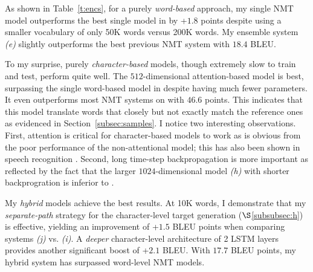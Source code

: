 As shown in Table~\ref{t:encs}, for a purely {\it word-based} approach, 
my single NMT model outperforms the best single model in \cite{jean15wmt} by
+$1.8$ points despite
using a smaller vocabulary of only 50K words versus 200K words. 
My ensemble system {\it (e)} slightly outperforms the best previous NMT system with $18.4$ BLEU.

To my surprise, purely {\it character-based} models, though extremely slow to
train and test, perform quite well. The $512$-dimensional attention-based model \modelchar{} is
best, surpassing the single word-based model in
\cite{jean15wmt} despite having much fewer parameters. It even outperforms most NMT
systems  
on \chr{} with $46.6$ points. This indicates that this model translate words that closely but
not exactly match the reference ones as evidenced in
Section~\ref{subsec:samples}. 
I notice two interesting observations. First,
attention is critical for character-based models to work as is obvious from the
poor performance of the non-attentional model; this has also been shown in speech
recognition \cite{chan16}. Second, long time-step backpropagation is more important
as reflected by the fact that the larger $1024$-dimensional model {\it (h)} with shorter
backprogration is inferior to \modelchar{}. 



My {\it hybrid} models achieve the best results. 
At 10K words, I demonstrate that my {\it
separate-path} strategy for the character-level target generation
($\S$\ref{subsubsec:h}) is effective, yielding an improvement of +$1.5$ BLEU
points when comparing systems {\it (j)} vs. {\it (i)}. A {\it deeper} character-level architecture of 2 LSTM
layers provides another significant
boost of +$2.1$ BLEU. %
With $17.7$ BLEU points, my hybrid system \modelsmall{} has
surpassed word-level NMT models.

